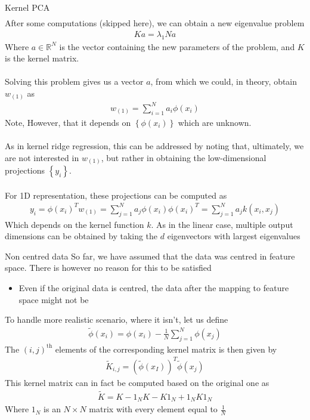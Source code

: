 \begin{parag}{Kernel PCA}
\begin{align*}
	\end{align*}
	After some computations (skipped here), we can obtain a new eigenvalue problem 
	\begin{align*} 
		Ka =  \lambda_1 Na
	\end{align*}
	Where $a \in \mathbb{R}^{N}$ is the vector containing the new parameters of the problem, and $K$ is the kernel matrix.\\
	$ $\\
	Solving this problem gives us a vector $a$, from which we could, in theory, obtain $w_{\left(1\right)}$ as 
	\begin{align*} 
		w_{\left(1\right)} =  \sum_{i= 1}^{N}a_i \phi\left(x_i\right)
	\end{align*}
	Note, However, that it depends on $\left\{\phi\left(x_i\right)\right\}$ which are unknown.\\
	$ $\\
	As in kernel ridge regression, this can be addressed by noting that, ultimately, we are not interested in $w_{\left(1\right)}$, but rather in obtaining the low-dimensional projections $\left\{y_i\right\}$.\\
	$ $\\
	For 1D representation, these projections can be computed as 
	\begin{align*} 
		y_i =  \phi\left(x_i\right)^{T}w_{\left(1\right)} =  \sum_{ j = 1}^{N} a_j \phi\left(x_i\right)\phi\left(x_i\right)^{T} = \sum_{j =  1}^{N}a_j k\left(x_i, x_j\right)
	\end{align*}
	Which depends on the kernel function $k$. As in the linear case, multiple output dimensions can be obtained by taking the $d$ eigenvectors with largest eigenvalues
\end{parag}


\begin{parag}{Non centred data}
    So far, we have assumed that the data was centred in feature space. There is however no reason for this to be satisfied 
	\begin{itemize}
	    \item Even if the original data is centred, the data after the mapping to feature space might not be
	\end{itemize}
	To handle more realistic scenario, where it isn't, let us define 
	\begin{align*} 
		\widetilde{\phi}\left(x_i\right) = \phi\left(x_i\right) - \frac{1}{N} \sum_{j = 1}^{N}\phi\left(x_j\right)
	\end{align*}
	The $\left(i, j\right)^{\text{th}}$ elements of the corresponding kernel matrix is then given by 
	\begin{align*} 
		\widetilde{K}_{i, j} = \left(\widetilde{\phi}\left(x_I\right)\right)^{T}\widetilde{\phi}\left(x_j\right)
	\end{align*}
	This kernel matrix can in fact be computed based on the original one as 
	\begin{align*} 
		\widetilde{K} =  K - 1_N K - K1_N + 1_NK1_N
	\end{align*}
	Where $1_N$ is an $N \times N$ matrix with every element equal to $\frac{1}{N}$
	

\end{parag}


